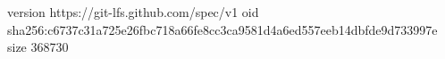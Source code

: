 version https://git-lfs.github.com/spec/v1
oid sha256:c6737c31a725e26fbc718a66fe8cc3ca9581d4a6ed557eeb14dbfde9d733997e
size 368730
